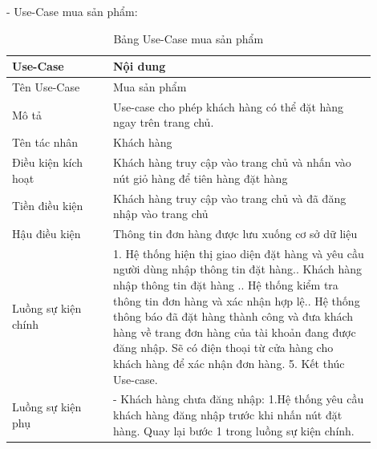 - Use-Case mua sản phẩm:
\begin{longtable}[htp]{ |m{0.25\linewidth}|m{0.65\linewidth}|}
 \caption{Bảng Use-Case mua sản phẩm \label{long}}\\
 \hline
 Use-Case & Nội dung \\
 \hline
 Tên Use-Case & Mua sản phẩm \\
 \hline
 Mô tả & Use-case cho phép khách hàng có thể đặt hàng ngay trên trang chủ.\\
 \hline
 Tên tác nhân & Khách hàng\\
 \hline
 Điều kiện kích hoạt & Khách hàng truy cập vào trang chủ và nhấn vào nút giỏ hàng để tiên hàng đặt hàng \\
 \hline
 Tiền điều kiện & Khách hàng truy cập vào trang chủ và đã đăng nhập vào trang chủ\\
 \hline
 Hậu điều kiện & Thông tin đơn hàng được lưu xuống cơ sở dữ liệu\\
 \hline
 Luồng sự kiện chính & 
  1. Hệ thống hiện thị giao diện đặt hàng và yêu cầu người dùng nhập thông tin đặt hàng.\newline
  2. Khách hàng nhập thông tin đặt hàng .\newline
  3. Hệ thống kiểm tra thông tin đơn hàng và xác nhận hợp lệ.\newline
  4. Hệ thống thông báo đã đặt hàng thành công và đưa khách hàng về trang đơn hàng của tài khoản đang được đăng nhập\newline
  5. Sẽ có điện thoại từ cửa hàng cho khách hàng để xác nhận đơn hàng.
  5. Kết thúc Use-case.	
 \\
 \hline
 Luồng sự kiện phụ & 
 - Khách hàng chưa đăng nhập:\newline
 1.Hệ thống yêu cầu khách hàng đăng nhập trước khi nhấn nút đặt hàng.\newline
  Quay lại bước 1 trong luồng sự kiện chính.
 \\
 \hline
\end{longtable}

